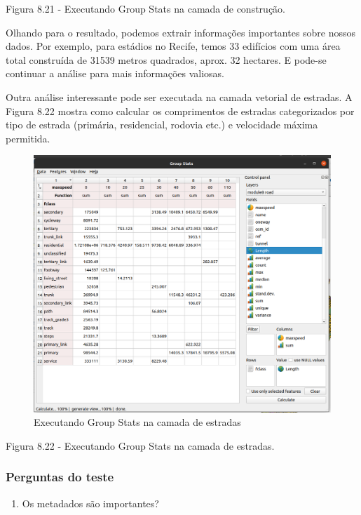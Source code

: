 \documentclass[
]{book}
\providecommand{\tightlist}{%
  \setlength{\itemsep}{0pt}\setlength{\parskip}{0pt}}
\begin{document}
Figura 8.21 - Executando Group Stats na camada de construção.

Olhando para o resultado, podemos extrair informações importantes sobre nossos dados. Por exemplo, para estádios no Recife, temos 33 edifícios com uma área total construída de 31539 metros quadrados, aprox. 32 hectares. E pode-se continuar a análise para mais informações valiosas.

Outra análise interessante pode ser executada na camada vetorial de estradas. A Figura 8.22 mostra como calcular os comprimentos de estradas categorizados por tipo de estrada (primária, residencial, rodovia etc.) e velocidade máxima permitida.

\begin{figure}
\centering
\includegraphics{media/modulo8/fig822.png}
\caption{Executando Group Stats na camada de estradas}
\end{figure}

Figura 8.22 - Executando Group Stats na camada de estradas.

\hypertarget{perguntas-do-teste}{%
\subsubsection{\texorpdfstring{\textbf{Perguntas do teste}}{Perguntas do teste}}\label{perguntas-do-teste}}

\begin{enumerate}
\def\labelenumi{\arabic{enumi}.}
\tightlist
\item
  Os metadados são importantes?
\end{enumerate}
\end{document}
